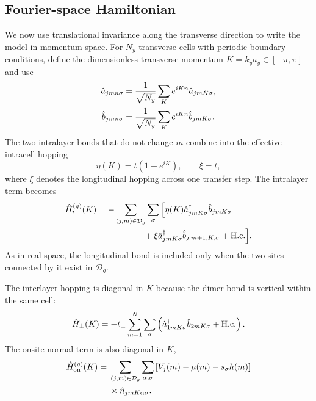 \subsection{Fourier-space Hamiltonian}
\label{subsec:fourier-hamiltonian}

We now use translational invariance along the transverse direction to write the model in momentum space.  For $N_y$ transverse cells with periodic boundary conditions, define the dimensionless transverse momentum $K=k_y a_y\in[-\pi,\pi]$ and use
\begin{align}
	\hat a_{jmn\sigma}
	 & =
	\frac{1}{\sqrt{N_y}}
	\sum_K e^{iKn}\hat a_{jmK\sigma},
	\notag \\
	\hat b_{jmn\sigma}
	 & =
	\frac{1}{\sqrt{N_y}}
	\sum_K e^{iKn}\hat b_{jmK\sigma}.
	\label{eq:fourier-convention}
\end{align}
The two intralayer bonds that do not change $m$ combine into the effective intracell hopping
\begin{equation}
	\eta(K)=t(1+e^{iK}),
	\qquad
	\xi=t,
	\label{eq:eta-xi}
\end{equation}
where $\xi$ denotes the longitudinal hopping across one transfer step.  The intralayer term becomes
\begin{align}
	\hat H_t^{(g)}(K)
	 & =-
	\sum_{(j,m)\in\mathcal D_g}
	\sum_\sigma
	\Big[
		\eta(K)
		\hat a_{jmK\sigma}^{\dagger}
		\hat b_{jmK\sigma}
	\notag            \\
	 & \hspace{5.5em}
		+
		\xi
		\hat a_{jmK\sigma}^{\dagger}
		\hat b_{j,m+1,K,\sigma}
		+\mathrm{H.c.}
		\Big].
	\label{eq:H-t-K}
\end{align}
As in real space, the longitudinal bond is included only when the two sites connected by it exist in $\mathcal D_g$.

The interlayer hopping is diagonal in $K$ because the dimer bond is vertical within the same cell:
\begin{equation}
	\hat H_\perp(K)
	=
	-t_\perp
	\sum_{m=1}^{N}
	\sum_\sigma
	\left(
	\hat a_{1mK\sigma}^{\dagger}
	\hat b_{2mK\sigma}
	+\mathrm{H.c.}
	\right).
	\label{eq:H-perp-K}
\end{equation}
The onsite normal term is also diagonal in $K$,
\begin{equation}
	\begin{split}
		\hat H_{\rm on}^{(g)}(K)
		={} &
		\sum_{(j,m)\in\mathcal D_g}
		\sum_{\alpha,\sigma}
		\left[ V_j(m)-\mu(m)-s_\sigma h(m)\right]
		\\
		    & \times
		\hat n_{jmK\alpha\sigma}.
	\end{split}
	\label{eq:H-on-K}
\end{equation}


